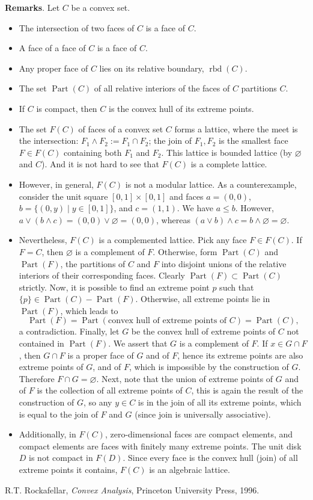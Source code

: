 \documentclass[12pt]{article}
\begin{document}
\textbf{Remarks}.
Let $C$ be a convex set.
\begin{itemize}
\item The intersection of two faces of $C$ is a face of $C$.
\item A face of a face of $C$ is a face of $C$.
\item Any proper face of $C$ lies on its relative boundary,
$\operatorname{rbd}(C)$.
\item The set $\operatorname{Part}(C)$ of all relative interiors of the faces of $C$ partitions $C$.
\item If $C$ is compact, then $C$ is the convex hull of its extreme points.
\item The set $F(C)$ of faces of a convex set $C$ forms a lattice, where the meet is the intersection: $F_1 \wedge F_2 := F_1\cap F_2$; the join of $F_1,F_2$ is the smallest face $F\in F(C)$ containing both $F_1$ and $F_2$.  This lattice is bounded lattice (by $\varnothing$ and $C$).  And it is not hard to see that $F(C)$ is a complete lattice.
\item
However, in general, $F(C)$ is not a modular lattice.  As a counterexample, consider the unit square $[0,1]\times [0,1]$ and faces $a=(0,0)$, $b=\lbrace (0,y)\mid y\in [0,1]\rbrace$, and $c=(1,1)$.  We have $a\le b$.  However, $a\vee (b\wedge c)=(0,0)\vee \varnothing=(0,0)$, whereas $(a\vee b)\wedge c = b\wedge \varnothing=\varnothing$.
\item Nevertheless, $F(C)$ is a complemented lattice.  Pick any face $F\in F(C)$.  If $F=C$, then $\varnothing$ is a complement of $F$.  Otherwise, form $\operatorname{Part}(C)$ and $\operatorname{Part}(F)$, the partitions of $C$ and $F$ into disjoint unions of the relative interiors of their corresponding faces.  Clearly $\operatorname{Part}(F)\subset \operatorname{Part}(C)$ strictly.  Now, it is possible to find an extreme point $p$ such that $\lbrace p\rbrace\in \operatorname{Part}(C)-\operatorname{Part}(F)$.  Otherwise, all extreme points lie in $\operatorname{Part}(F)$, which leads to 
$$\operatorname{Part}(F) = \operatorname{Part}(\mbox{convex hull of extreme points of }C)=\operatorname{Part}(C),$$ a contradiction.  Finally, let $G$ be the convex hull of extreme points of $C$ not contained in $\operatorname{Part}(F)$.  We assert that $G$ is a complement of $F$.  If $x\in G\cap F$, then $G\cap F$ is a proper face of $G$ and of $F$, hence its extreme points are also extreme points of $G$, and of $F$, which is impossible by the construction of $G$.  Therefore $F\cap G=\varnothing$.  Next, note that the union of extreme points of $G$ and of $F$ is the collection of all extreme points of $C$, this is again the result of the construction of $G$, so any $y\in C$ is in the join of all its extreme points, which is equal to the join of $F$ and $G$ (since join is universally associative).
\item 
Additionally, in $F(C)$, zero-dimensional faces are compact elements, and compact elements are faces with finitely many extreme points.  The unit disk $D$ is not compact in $F(D)$.  Since every face is the convex hull (join) of all extreme points it contains, $F(C)$ is an algebraic lattice.
\end{itemize}

\begin{thebibliography}{9}
 R.T. Rockafellar, \emph{Convex Analysis}, Princeton University Press, 1996.
\end{thebibliography}
\end{document}
